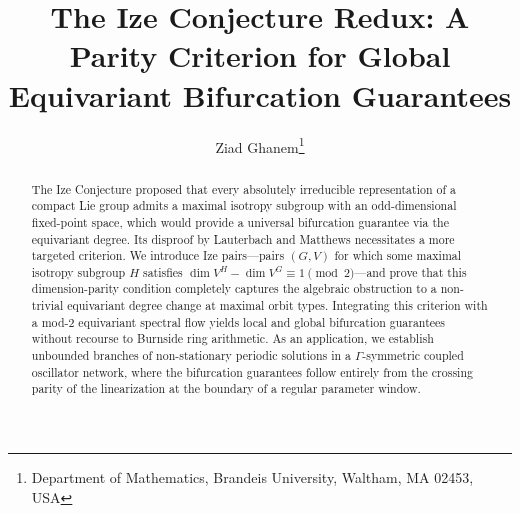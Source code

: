 \documentclass[twoside]{article}%
\begin{document}
\title{The Ize Conjecture Redux: A Parity Criterion for Global Equivariant Bifurcation Guarantees} 


\author{
Ziad Ghanem\thanks{\small Department of Mathematics, Brandeis University, Waltham, MA 02453, USA
}}
\date{}

\maketitle

\begin{abstract}
The Ize Conjecture proposed that every absolutely irreducible representation of a compact Lie group admits a maximal isotropy subgroup with an odd-dimensional fixed-point space, which would provide a universal bifurcation guarantee via the equivariant degree. Its disproof by Lauterbach and Matthews necessitates a more targeted criterion. We introduce Ize pairs---pairs $(G, V)$ for which some maximal isotropy subgroup $H$ satisfies $\dim V^H - \dim V^G \equiv 1 \pmod{2}$---and prove that this dimension-parity condition completely captures the algebraic obstruction to a non-trivial equivariant degree change at 
maximal orbit types. Integrating this criterion with a mod-2 equivariant spectral flow yields local and global bifurcation guarantees without recourse to Burnside ring arithmetic. As an application, we establish unbounded branches of non-stationary periodic solutions in a $\Gamma$-symmetric coupled oscillator network, where the bifurcation guarantees follow entirely from the crossing parity of the linearization at the boundary of a regular parameter window.
\end{abstract}
\end{document}
